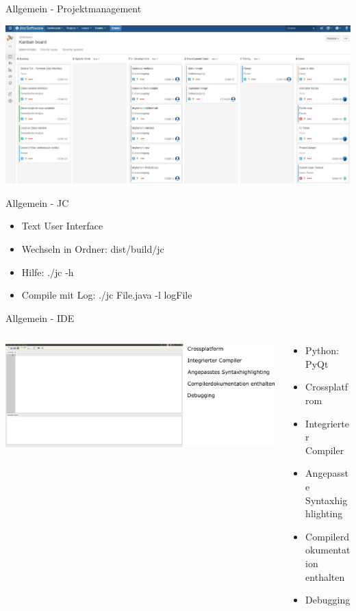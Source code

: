 \begin{frame}{Allgemein - Projektmanagement}

\includegraphics[scale=0.25]{images/allgemein/jira.jpg}

\end{frame}

\begin{frame}{Allgemein - JC}

\begin{itemize}
	\item Text User Interface
	\item Wechseln in Ordner: dist/build/jc
	\item Hilfe: ./jc -h
	\item Compile mit Log: ./jc File.java -l logFile
\end{itemize}

\end{frame}

\begin{frame}{Allgemein - IDE}

\begin{columns}
	\begin{column}{0.5\textwidth}
		\includegraphics[scale=0.1]{images/allgemein/ide.png}
	\end{column}
	\begin{column}{0.5\textwidth}
			\begin{itemize}
				\item Python: PyQt
				\item Crossplatfrom
				\item Integrierter Compiler
				\item Angepasste Syntaxhighlighting
				\item Compilerdokumentation enthalten
				\item Debugging
			\end{itemize}
	\end{column}
\end{columns}


\end{frame}
